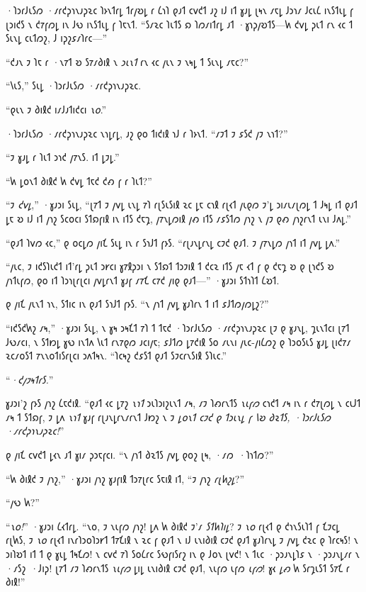 ·𐑐𐑮𐑩𐑓𐑧𐑕𐑼 ·𐑥𐑩𐑒𐑜𐑪𐑯𐑨𐑜𐑷𐑤 𐑐𐑶𐑯𐑑𐑩𐑛 𐑑𐑩𐑢𐑹𐑛 𐑩 𐑖𐑪𐑐 𐑞𐑨𐑑 𐑤𐑫𐑒𐑑 𐑨𐑟 𐑦𐑓 𐑦𐑑 𐑣𐑨𐑛 𐑚𐑰𐑯 𐑥𐑱𐑛 𐑓𐑮𐑪𐑥 𐑓𐑤𐑧𐑖 𐑦𐑯𐑕𐑑𐑧𐑛 𐑝 𐑚𐑮𐑦𐑒𐑕 𐑯 𐑒𐑳𐑝𐑼𐑛 𐑦𐑯 𐑓𐑻 𐑦𐑯𐑕𐑑𐑧𐑛 𐑝 𐑐𐑱𐑯𐑑. “𐑕𐑥𐑷𐑤 𐑐𐑧𐑑𐑕 𐑸 𐑐𐑼𐑥𐑦𐑑𐑩𐑛 𐑨𐑑 ·𐑣𐑪𐑜𐑢𐑹𐑑𐑕—𐑿 𐑒𐑫𐑛 𐑜𐑧𐑑 𐑩𐑯 𐑬𐑤 𐑑 𐑕𐑧𐑯𐑛 𐑤𐑧𐑑𐑼𐑟, 𐑓 𐑦𐑜𐑟𐑭𐑥𐑐𐑩𐑤—”

“𐑒𐑨𐑯 𐑲 𐑐𐑱 𐑩 ·𐑯𐑳𐑑 𐑹 𐑕𐑳𐑥𐑔𐑦𐑙 𐑯 \emph{𐑮𐑧𐑯𐑑} 𐑩𐑯 𐑬𐑤 𐑢𐑧𐑯 𐑲 𐑯𐑰𐑛 𐑑 𐑕𐑧𐑯𐑛 𐑥𐑱𐑤?”

“𐑘𐑧𐑕,” 𐑕𐑧𐑛 ·𐑐𐑮𐑩𐑓𐑧𐑕𐑼 ·𐑥𐑩𐑒𐑜𐑪𐑯𐑨𐑜𐑷𐑤.

“𐑞𐑧𐑯 𐑲 𐑔𐑦𐑙𐑒 𐑦𐑥𐑓𐑨𐑑𐑦𐑒𐑤𐑦 \emph{𐑯𐑴}.”

·𐑐𐑮𐑩𐑓𐑧𐑕𐑼 ·𐑥𐑩𐑒𐑜𐑪𐑯𐑨𐑜𐑷𐑤 𐑯𐑪𐑛𐑩𐑛, 𐑨𐑟 𐑞𐑴 𐑑𐑦𐑒𐑦𐑙 𐑪𐑓 𐑩 𐑐𐑶𐑯𐑑. “𐑥𐑲𐑑 𐑲 𐑭𐑕𐑒 𐑢𐑲 𐑯𐑪𐑑?”

“𐑲 𐑣𐑨𐑛 𐑩 𐑐𐑧𐑑 𐑮𐑪𐑒 𐑢𐑳𐑯𐑕. 𐑦𐑑 𐑛𐑲𐑛.”

“𐑿 𐑛𐑴𐑯𐑑 𐑔𐑦𐑙𐑒 𐑿 𐑒𐑫𐑛 𐑑𐑱𐑒 𐑒𐑺 𐑝 𐑩 𐑐𐑧𐑑?”

“𐑲 \emph{𐑒𐑫𐑛},” ·𐑣𐑨𐑮𐑦 𐑕𐑧𐑛, “𐑚𐑳𐑑 𐑲 𐑢𐑫𐑛 𐑧𐑯𐑛 𐑳𐑐 𐑩𐑚𐑕𐑧𐑕𐑦𐑙 𐑷𐑤 𐑛𐑱 𐑤𐑪𐑙 𐑩𐑚𐑬𐑑 𐑢𐑧𐑞𐑼 𐑲'𐑛 𐑮𐑦𐑥𐑧𐑥𐑚𐑼𐑛 𐑑 𐑓𐑰𐑛 𐑦𐑑 𐑞𐑨𐑑 𐑛𐑱 𐑹 𐑦𐑓 𐑦𐑑 𐑢𐑪𐑟 𐑕𐑤𐑴𐑤𐑦 𐑕𐑑𐑸𐑝𐑦𐑙 𐑦𐑯 𐑦𐑑𐑕 𐑒𐑱𐑡, 𐑢𐑳𐑯𐑛𐑼𐑦𐑙 𐑢𐑺 𐑦𐑑𐑕 𐑥𐑭𐑕𐑑𐑼 𐑢𐑪𐑟 𐑯 𐑢𐑲 𐑞𐑺 𐑢𐑪𐑟𐑩𐑯𐑑 𐑧𐑯𐑦 𐑓𐑵𐑛.”

“𐑞𐑨𐑑 𐑐𐑫𐑼 𐑬𐑤,” 𐑞 𐑴𐑤𐑛𐑼 𐑢𐑦𐑗 𐑕𐑧𐑛 𐑦𐑯 𐑩 𐑕𐑪𐑓𐑑 𐑝𐑶𐑕. “𐑩𐑚𐑨𐑯𐑛𐑩𐑯𐑛 𐑤𐑲𐑒 𐑞𐑨𐑑. 𐑲 𐑢𐑳𐑯𐑛𐑼 𐑢𐑪𐑑 𐑦𐑑 𐑢𐑫𐑛 𐑛𐑵.”

“𐑢𐑧𐑤, 𐑲 𐑦𐑒𐑕𐑐𐑧𐑒𐑑 𐑦𐑑'𐑩𐑛 𐑜𐑧𐑑 𐑮𐑾𐑤𐑦 𐑣𐑳𐑙𐑜𐑮𐑦 𐑯 𐑕𐑑𐑸𐑑 𐑑𐑮𐑲𐑦𐑙 𐑑 𐑒𐑤𐑷 𐑦𐑑𐑕 𐑢𐑱 𐑬𐑑 𐑝 𐑞 𐑒𐑱𐑡 𐑹 𐑞 𐑚𐑪𐑒𐑕 𐑹 𐑢𐑪𐑑𐑧𐑝𐑼, 𐑞𐑴 𐑦𐑑 𐑐𐑮𐑪𐑚𐑩𐑚𐑤𐑦 𐑢𐑫𐑛𐑩𐑯𐑑 𐑣𐑨𐑝 𐑥𐑳𐑗 𐑤𐑳𐑒 𐑢𐑦𐑞 𐑞𐑨𐑑—” ·𐑣𐑨𐑮𐑦 𐑕𐑑𐑪𐑐𐑑 𐑖𐑹𐑑.

𐑞 𐑢𐑦𐑗 𐑢𐑧𐑯𐑑 𐑪𐑯, 𐑕𐑑𐑦𐑤 𐑦𐑯 𐑞𐑨𐑑 𐑕𐑪𐑓𐑑 𐑝𐑶𐑕. “𐑯 𐑢𐑪𐑑 𐑢𐑫𐑛 𐑣𐑨𐑐𐑩𐑯 𐑑 𐑦𐑑 𐑭𐑓𐑑𐑼𐑢𐑼𐑛𐑟?”

“𐑦𐑒𐑕𐑒𐑿𐑟 𐑥𐑰,” ·𐑣𐑨𐑮𐑦 𐑕𐑧𐑛, 𐑯 𐑣𐑰 𐑮𐑰𐑗𐑑 𐑳𐑐 𐑑 𐑑𐑱𐑒 ·𐑐𐑮𐑩𐑓𐑧𐑕𐑼 ·𐑥𐑩𐑒𐑜𐑪𐑯𐑨𐑜𐑷𐑤 𐑚𐑲 𐑞 𐑣𐑨𐑯𐑛, 𐑡𐑧𐑯𐑑𐑤𐑦 𐑚𐑳𐑑 𐑓𐑻𐑥𐑤𐑦, 𐑯 𐑕𐑑𐑽𐑛 𐑣𐑻 𐑦𐑯𐑑𐑵 𐑘𐑧𐑑 𐑩𐑯𐑳𐑞𐑼 𐑨𐑤𐑦𐑢𐑱; 𐑭𐑓𐑑𐑼 𐑛𐑳𐑒𐑦𐑙 𐑕𐑴 𐑥𐑧𐑯𐑦 𐑢𐑧𐑤-𐑢𐑦𐑖𐑼𐑟 𐑞 𐑐𐑮𐑴𐑕𐑧𐑕 𐑣𐑨𐑛 𐑚𐑦𐑒𐑳𐑥 𐑷𐑤𐑥𐑴𐑕𐑑 𐑳𐑯𐑯𐑴𐑑𐑦𐑕𐑩𐑚𐑤𐑦 𐑮𐑵𐑑𐑰𐑯. “𐑐𐑤𐑰𐑟 𐑒𐑭𐑕𐑑 𐑞𐑨𐑑 𐑕𐑲𐑤𐑩𐑯𐑕𐑦𐑙 𐑕𐑐𐑧𐑤.”

“\emph{·𐑒𐑢𐑲𐑰𐑑𐑩𐑕.}”

𐑣𐑨𐑮𐑦'𐑟 𐑝𐑶𐑕 𐑢𐑪𐑟 𐑖𐑱𐑒𐑦𐑙. “𐑞𐑨𐑑 𐑬𐑤 𐑛𐑳𐑟 \emph{𐑯𐑪𐑑} 𐑮𐑧𐑐𐑮𐑦𐑟𐑧𐑯𐑑 𐑥𐑰, 𐑥𐑲 𐑐𐑺𐑩𐑯𐑑𐑕 \emph{𐑯𐑧𐑝𐑼} 𐑤𐑪𐑒𐑑 𐑥𐑰 𐑦𐑯 𐑩 𐑒𐑳𐑚𐑼𐑛 𐑯 𐑤𐑧𐑓𐑑 𐑥𐑰 𐑑 𐑕𐑑𐑸𐑝, 𐑲 𐑛𐑵 \emph{𐑯𐑪𐑑} 𐑣𐑨𐑝 𐑩𐑚𐑨𐑯𐑛𐑩𐑯𐑥𐑩𐑯𐑑 𐑓𐑽𐑟 𐑯 𐑲 \emph{𐑛𐑴𐑯𐑑 𐑤𐑲𐑒 𐑞 𐑑𐑮𐑧𐑯𐑛 𐑝 𐑘𐑹 𐑔𐑷𐑑𐑕, ·𐑐𐑮𐑩𐑓𐑧𐑕𐑼 ·𐑥𐑩𐑒𐑜𐑪𐑯𐑨𐑜𐑷𐑤!}”

𐑞 𐑢𐑦𐑗 𐑤𐑫𐑒𐑑 𐑛𐑬𐑯 𐑨𐑑 𐑣𐑦𐑥 𐑜𐑮𐑱𐑝𐑤𐑦. “𐑯 𐑢𐑪𐑑 𐑔𐑷𐑑𐑕 𐑢𐑫𐑛 𐑞𐑴𐑟 𐑚𐑰, ·𐑥𐑼~·𐑐𐑪𐑑𐑼?”

“𐑿 𐑔𐑦𐑙𐑒 𐑲 𐑢𐑪𐑟,” ·𐑣𐑨𐑮𐑦 𐑢𐑪𐑟 𐑣𐑨𐑝𐑦𐑙 𐑑𐑮𐑳𐑚𐑩𐑤 𐑕𐑱𐑦𐑙 𐑦𐑑, “𐑲 𐑢𐑪𐑟 \emph{𐑩𐑚𐑿𐑟𐑛}?”

“𐑢𐑻 𐑿?”

“\emph{𐑯𐑴!}” ·𐑣𐑨𐑮𐑦 𐑖𐑬𐑑𐑩𐑛. “𐑯𐑴, 𐑲 𐑯𐑧𐑝𐑼 𐑢𐑪𐑟! 𐑛𐑵 𐑿 𐑔𐑦𐑙𐑒 𐑲'𐑥 \emph{𐑕𐑑𐑿𐑐𐑦𐑛}? 𐑲 \emph{𐑯𐑴} 𐑩𐑚𐑬𐑑 𐑞 𐑒𐑪𐑯𐑕𐑧𐑐𐑑 𐑝 𐑗𐑲𐑤𐑛 𐑩𐑚𐑿𐑕, 𐑲 \emph{𐑯𐑴} 𐑩𐑚𐑬𐑑 𐑦𐑯𐑩𐑐𐑮𐑴𐑐𐑮𐑾𐑑 𐑑𐑳𐑗𐑦𐑙 𐑯 𐑷𐑤 𐑝 𐑞𐑨𐑑 𐑯 𐑦𐑓 𐑧𐑯𐑦𐑔𐑦𐑙 𐑤𐑲𐑒 𐑞𐑨𐑑 𐑣𐑨𐑐𐑩𐑯𐑛 𐑲 𐑢𐑫𐑛 𐑒𐑷𐑤 𐑞 𐑐𐑩𐑤𐑰𐑕! 𐑯 𐑮𐑦𐑐𐑹𐑑 𐑦𐑑 𐑑 𐑞 𐑣𐑧𐑛 𐑑𐑰𐑗𐑼! 𐑯 𐑤𐑫𐑒 𐑳𐑐 𐑕𐑴𐑖𐑩𐑤 𐑕𐑻𐑝𐑦𐑕𐑩𐑟 𐑦𐑯 𐑞 𐑓𐑴𐑯 𐑚𐑫𐑒! 𐑯 𐑑𐑧𐑤 ·𐑜𐑮𐑨𐑯𐑛𐑐𐑭 𐑯 ·𐑜𐑮𐑨𐑯𐑛𐑥𐑩 𐑯 ·𐑥𐑕𐑟~·𐑓𐑦𐑜! 𐑚𐑳𐑑 𐑥𐑲 𐑐𐑺𐑩𐑯𐑑𐑕 \emph{𐑯𐑧𐑝𐑼} 𐑛𐑦𐑛 𐑧𐑯𐑦𐑔𐑦𐑙 𐑤𐑲𐑒 𐑞𐑨𐑑, 𐑯𐑧𐑝𐑼 𐑧𐑝𐑼 \emph{𐑧𐑝𐑼}! 𐑣𐑬 \emph{𐑛𐑺} 𐑿 𐑕𐑩𐑡𐑧𐑕𐑑 𐑕𐑳𐑗 𐑩 𐑔𐑦𐑙!”

